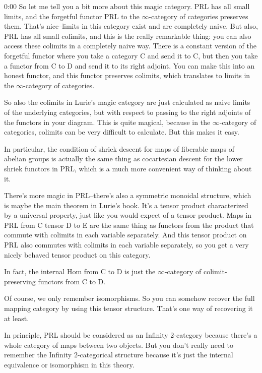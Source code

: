 \begin{unfinished}{0:00}
So let me tell you a bit more about this magic category. PRL has all small limits, and the forgetful functor PRL to the $\infty$-category of categories preserves them. That's nice--limits in this category exist and are completely naive. But also, PRL has all small colimits, and this is the really remarkable thing: you can also access these colimits in a completely naive way. There is a constant version of the forgetful functor where you take a category C and send it to C, but then you take a functor from C to D and send it to its right adjoint. You can make this into an honest functor, and this functor preserves colimits, which translates to limits in the $\infty$-category of categories.

So also the colimits in Lurie's magic category are just calculated as naive limits of the underlying categories, but with respect to passing to the right adjoints of the functors in your diagram. This is quite magical, because in the $\infty$-category of categories, colimits can be very difficult to calculate. But this makes it easy.

In particular, the condition of shriek descent for maps of fiberable maps of abelian groups is actually the same thing as cocartesian descent for the lower shriek functors in PRL, which is a much more convenient way of thinking about it.

There's more magic in PRL--there's also a symmetric monoidal structure, which is maybe the main theorem in Lurie's book. It's a tensor product characterized by a universal property, just like you would expect of a tensor product. Maps in PRL from C tensor D to E are the same thing as functors from the product that commute with colimits in each variable separately. And this tensor product on PRL also commutes with colimits in each variable separately, so you get a very nicely behaved tensor product on this category.

In fact, the internal Hom from C to D is just the $\infty$-category of colimit-preserving functors from C to D.

Of course, we only remember isomorphisms. So you can somehow recover the full mapping category by using this tensor structure. That's one way of recovering it at least.

In principle, PRL should be considered as an Infinity 2-category because there's a whole category of maps between two objects. But you don't really need to remember the Infinity 2-categorical structure because it's just the internal equivalence or isomorphism in this theory.


\end{unfinished}

